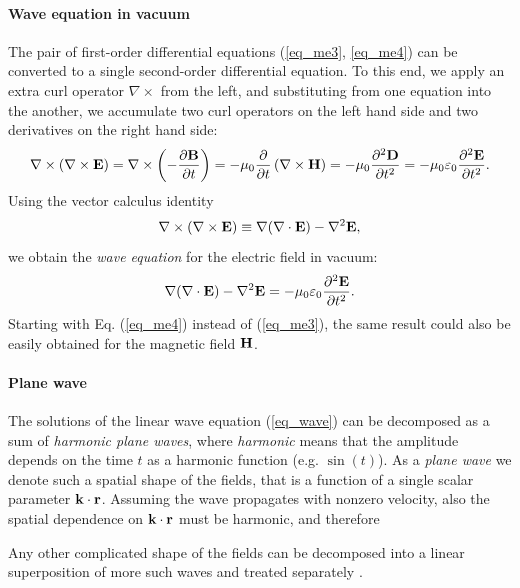 \paragraph{Wave equation in vacuum} %
\label{starttext}
The pair of first-order differential equations (\ref{eq_me3}, \ref{eq_me4}) can be converted to a single second-order differential equation. To this end, we apply an extra curl operator $\nabla\times$ from the left, and substituting from one equation into the another, we accumulate two curl operators on the left hand side and two derivatives on the right hand side: 
\begin{equation} \nabla\times (\nabla\times \mathbf{E}) = \nabla\times \left(- \frac{\partial \mathbf{B}} {\partial t}\right) = -\mu_0 \frac{\partial}{\partial t} \left(\nabla\times \mathbf{H}\right) 
= -\mu_0 \frac{\partial^{2} \mathbf{D}}{\partial t^{2}} = -\mu_0 \varepsilon_0 \frac{\partial^{2} \mathbf{E}}{\partial t^{2}}.  \label{eq_elim}\end{equation}
Using the vector calculus identity
\begin{equation} \nabla\times (\nabla\times \mathbf{E}) \equiv \nabla (\nabla \cdot \mathbf{E}) - \nabla^2 \mathbf{E}, \label{eq_rotrot}\end{equation}
we obtain the \textit{wave equation} for the electric field in vacuum: 
\begin{equation}  \nabla (\nabla \cdot \mathbf{E}) - \nabla^2 \mathbf{E} = -\mu_0 \varepsilon_0 \frac{\partial^{2} \mathbf{E}}{\partial t^{2}}.  \label{eq_wave}\end{equation}
Starting with Eq. (\ref{eq_me4}) instead of (\ref{eq_me3}), the same result could also be easily obtained for the magnetic field $\mathbf{H}$.
\paragraph{Plane wave} %
The solutions of the linear wave equation (\ref{eq_wave}) can be decomposed as a sum of \textit{harmonic plane waves}, where \textit{harmonic} means that the amplitude depends on the time $t$ as a harmonic function (e.g. $\sin(t)$). As a \textit{plane wave} we denote such a spatial shape of the fields, that is a function of a single  scalar parameter ${\mathbf{k}}\cdot{\mathbf{r}}$. Assuming the wave propagates with nonzero velocity, also the spatial dependence on  ${\mathbf{k}}\cdot{\mathbf{r}}$ must be harmonic, and therefore 

Any other complicated shape of the fields can be decomposed into a linear superposition of more such waves and treated separately \cite{jackson1962book}. 

